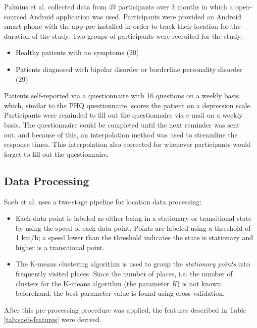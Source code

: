 Palmius et al. collected data from 49 participants over 3 months in which a open-sourced Android application was used. Participants were provided an Android smart-phone with the app pre-installed in order to track their location for the duration of the study. Two groups of participants were recruited for the study:

\begin{itemize}
    \item Healthy patients with no symptoms (20)
    \item Patients diagnosed with bipolar disorder or borderline personality disorder (29)
\end{itemize}

Patients self-reported via a questionnaire with 16 questions on a weekly basis which, similar to the PHQ questionnaire, scores the patient on a depression scale. Participants were reminded to fill out the questionnaire via e-mail on a weekly basis. The questionnaire could be completed until the next reminder was sent out, and because of this, an interpolation method was used to streamline the response times. This interpolation also corrected for whenever participants would forget to fill out the questionnaire. 

\subsection{Data Processing}
Saeb et al. uses a two-stage pipeline for location data processing: 
\begin{itemize}
    \item Each data point is labeled as either being in a stationary or transitional state by using the speed of each data point. Points are labeled using a threshold of 1 km/h; a speed lower than the threshold indicates the state is stationary and higher is a transitional point. 
    \item The K-means clustering algorithm is used to group the \textit{stationary points} into frequently visited places. Since the number of places, i.e. the number of clusters for the K-means algorithm (the parameter \textit{K}) is not known beforehand, the best parameter value is found using cross-validation.
\end{itemize}

After this pre-processing procedure was applied, the features described in Table \ref{tab:saeb-features} were derived.\\ 


